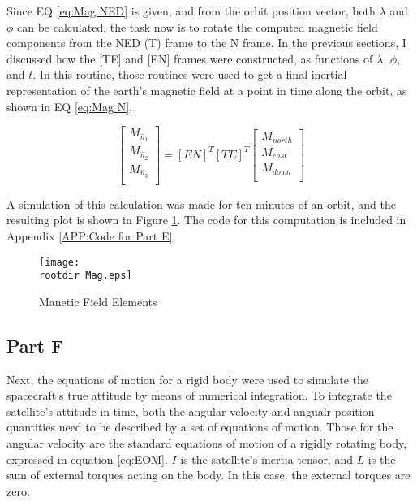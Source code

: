 \documentclass[11pt]{aiaa-tc}%
\newcommand{\brackets} [1] {\left[ #1 \right]}
\newcommand{\rootdir}{./Figures/}
\newcommand{\arrayb}[2]{\brackets{ \begin{array}{#1}  #2 \end{array} } }
\begin{document}
Since EQ \ref{eq:Mag NED} is given, and from the orbit position vector, both $\lambda$ and $\phi$ can be calculated, the task now is to rotate the computed magnetic field components from the NED (T) frame to the N frame. In the previous sections, I discussed how the [TE] and [EN] frames were constructed, as functions of $\lambda$, $\phi$, and $t$. In this routine, those routines were used to get a final inertial representation of the earth's magnetic field at a point in time along the orbit, as shown in EQ \ref{eq:Mag N}.

\begin{equation}
	\label{eq:Mag N}
	\arrayb{c}{M_{\hat{n}_1} \\ M_{\hat{n}_2} \\ M_{\hat{n}_3}\\} 
	=
	[EN]^T [TE]^T \arrayb{c}{M_{north} \\ M_{east} \\ M_{down}\\} 
\end{equation}

A simulation of this calculation was made for ten minutes of an orbit, and the resulting plot is shown in Figure \ref{fig:Mag}. The code for this computation is included in Appendix \ref{APP:Code for Part E}.


\begin{centering}
	\begin{figure}[Hh]
		\texttt{[image: \\rootdir Mag.eps]}
		\caption{Manetic Field Elements}
		\label{fig:Mag}
	\end{figure}
\end{centering}


\subsection{Part F}
\label{sec:Att Ang Vel True}
Next, the equations of motion for a rigid body were used to simulate the spacecraft's true attitude by means of numerical integration.  To integrate the satellite's attitude in time, both the angular velocity and angualr position quantities need to be described by a set of equations of motion. Those for the angular velocity are the standard equations of motion of a rigidly rotating body, expressed in equation \ref{eq:EOM}. $I$ is the satellite's inertia tensor, and $L$ is the sum of external torques acting on the body. In this case, the external torques are zero. 
\end{document}
